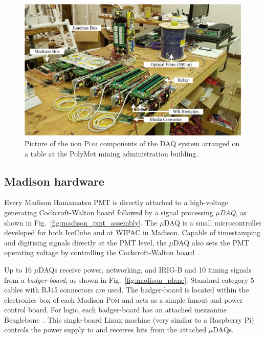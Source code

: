 \begin{figure} %
    \includegraphics[width=\textwidth]{diagrams/5-daq/full_setup.pdf}
    \caption[Picture of the non \textsc{Pom} components of the \chipsfive DAQ system]
    {Picture of the non \textsc{Pom} components of the \chipsfive DAQ system arranged on a table at the
        PolyMet mining administration building.}
    \label{fig:full_setup}
\end{figure}
\subsection{Madison hardware} %
\label{sec:daq_hard_madison} %

Every Madison Hamamatsu PMT is directly attached to a high-voltage generating Cockcroft-Walton
board followed by a signal processing \emph{$\mu$DAQ}, as shown in
Fig.~\ref{fig:madison_pmt_assembly}. The $\mu$DAQ is a small microcontroller developed for both
IceCube and \chips at WIPAC in Madison. Capable of timestamping and digitising signals directly at
the PMT level, the $\mu$DAQ also sets the PMT operating voltage by controlling the
Cockcroft-Walton board~\cite{eijk2018}.

Up to 16 $\mu$DAQs receive power, networking, and IRIG-B and \unit{10}{} timing
signals from a \emph{badger-board}, as shown in Fig.~\ref{fig:madison_plane}. Standard category 5
cables with RJ45 connectors are used. The badger-board is located within the electronics box of
each Madison \textsc{Pom} and acts as a simple fanout and power control board. For logic, each badger-board
has an attached mezzanine Beaglebone~\cite{beagle2020}. This single-board Linux machine (very
similar to a Raspberry Pi) controls the power supply to and receives hits from the attached
$\mu$DAQs.

